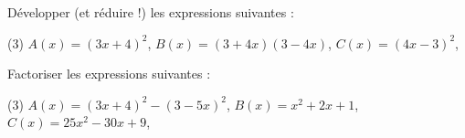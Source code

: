 %
%
\begin{mth}
Développer (et réduire !) les expressions suivantes :

\begin{tasks}[label=\labelitemi,after-item-skip=1pt](3)
\task $A(x)=(3x+4)^2$,
\task $B(x)=(3+4x)(3-4x)$,
\task  $C(x)=(4x-3)^2$,
\end{tasks}
\end{mth}
%
%
\begin{mth}
Factoriser les expressions suivantes :

\begin{tasks}[label=\labelitemi,after-item-skip=1pt](3)
\task $A(x)=(3x+4)^2-(3-5x)^2$,
\task $B(x)=x^2+2x+1$,
\task  $C(x)=25x^2-30x+9$,
\end{tasks}
\end{mth}
%
%
%
%
